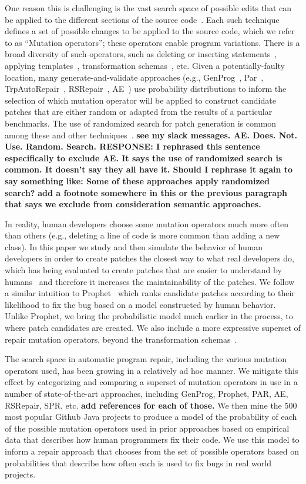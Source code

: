 \documentclass[conference]{IEEEtran}
\newcommand{\todo}[1]
  {{\scriptsize \textbf{\color{red} {#1}}}}
\begin{document}
One reason this is challenging is the vast search space of possible 
edits that can be applied to the different sections of the source 
code~\cite{long16}. Each such technique defines  a set of possible changes to be
applied to the source code, which we refer to as ``Mutation operators''; these operators enable program variations.
There is a broad diversity of such operators, such as deleting or inserting statements~\cite{legoues12}, applying templates~\cite{kim2013}, transformation schemas~\cite{fan15}, etc.
Given a potentially-faulty location, many
generate-and-validate approaches (e.g., GenProg~\cite{legoues12}, 
Par~\cite{kim2013}, TrpAutoRepair~\cite{Qi13}, RSRepair~\cite{Qi14},
AE~\cite{Weimer13}) use probability distributions to inform the selection of which mutation operator
will be applied to construct candidate patches that are either random or adapted
from the results of a particular benchmarks. The use of randomized search for patch generation is common among these and other techniques~\cite{arcuri08,bradbury10,Qi14,Weimer13}. \todo{see my slack messages.  AE.  Does.  Not.  Use.  Random.  Search. RESPONSE: I rephrased this sentence especifically to exclude AE. It says the use of randomized search is common. It doesn't say they all have it. Should I rephrase it again to say something like: Some of these approaches apply randomized search?}
\todo{add a footnote somewhere in this or the previous paragraph that says we exclude from consideration semantic approaches.}

In reality, human developers choose some mutation operators 
much more often than 
others (e.g., deleting a line of code is more common
than adding a new class). In this paper we study and then simulate the behavior of human developers in order 
to create patches the closest way to what real developers do, which has 
being evaluated to create patches that are easier to understand by
humans~\cite{kim2013} and 
therefore it increases the maintainability of the patches. We follow a similar
intuition to Prophet~\cite{long15} which ranks candidate patches
according to their likelihood to fix the bug based on a model constructed by
human behavior. Unlike Prophet, we bring the
probabilistic model much earlier in the process, to where
patch candidates are created. We also include a more expressive superset of repair mutation
operators, beyond the transformation schemas~\cite{fan15}.  

The search space in automatic program repair, including the various mutation
operators used, has been growing in a relatively ad hoc 
manner. We mitigate this effect by categorizing and comparing a superset of
mutation operators in use in a number of 
state-of-the-art approaches, including GenProg, Prophet, PAR, AE, RSRepair,
SPR, etc. \todo{add references for each of those.}
We then mine
the 500 most popular Github Java projects to produce a model of the probability of
each of the possible mutation operators used in prior approaches based on 
empirical data that describes how human programmers fix their code.  We use this
model to inform a repair approach that chooses from the set of possible
operators based on 
probabilities that describe how often each is used
to fix bugs in real world projects. 
\end{document}

